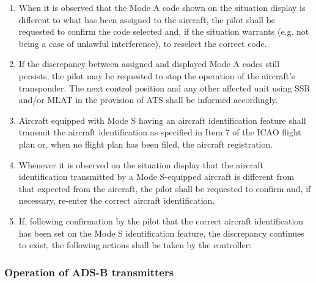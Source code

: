 \begin{enumerate}
    \item When it is observed that the Mode A code shown on the situation display is different to what has been assigned to the aircraft, the pilot shall be requested to confirm the code selected and, if the situation warrants (e.g. not being a case of unlawful interference), to reselect the correct code.
    \item If the discrepancy between assigned and displayed Mode A codes still persists, the pilot may be requested to stop the operation of the aircraft’s transponder. The next control position and any other affected unit using SSR and/or MLAT in the provision of ATS shall be informed accordingly.
    \item Aircraft equipped with Mode S having an aircraft identification feature shall transmit the aircraft identification as specified in Item 7 of the ICAO flight plan or, when no flight plan has been filed, the aircraft registration.
    \item Whenever it is observed on the situation display that the aircraft identification transmitted by a Mode S-equipped aircraft is different from that expected from the aircraft, the pilot shall be requested to confirm and, if necessary, re-enter the correct aircraft identification.
    \item If, following confirmation by the pilot that the correct aircraft identification has been set on the Mode S identification feature, the discrepancy continues to exist, the following actions shall be taken by the controller:

\end{enumerate}

\subsubsection{Operation of ADS-B transmitters}

